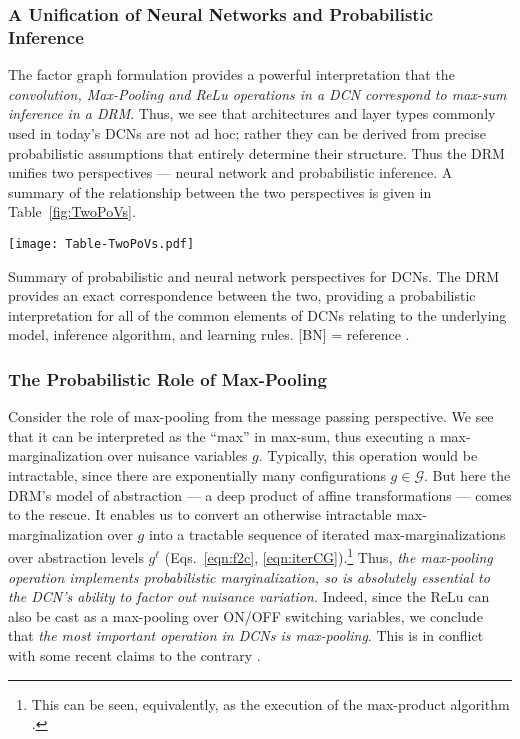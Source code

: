 \documentclass[12pt]{article}
\newcommand{\G}[0]{{ \mathcal{G} }}
\begin{document}
\subsubsection{A Unification of Neural Networks and Probabilistic Inference}

The factor graph formulation provides a powerful interpretation that the \emph{convolution, Max-Pooling and ReLu operations in a DCN correspond to max-sum inference in a DRM}. 
Thus, we see that architectures and layer types commonly used in today's DCNs are not ad hoc; rather they can be derived from precise probabilistic assumptions that entirely determine their structure. 
Thus the DRM unifies two perspectives --- neural network and probabilistic inference.
A summary of the relationship between the two perspectives is given in Table~\ref{fig:TwoPoVs}.

\begin{table}
   \centering
   \texttt{[image: Table-TwoPoVs.pdf]} 
   \caption{Summary of probabilistic and neural network perspectives for DCNs. The DRM provides an exact correspondence between the two, providing a probabilistic interpretation for all of the common elements of DCNs relating to the underlying model, inference algorithm, and learning rules. [BN] = reference \cite{ioffe2015batch}.}
   \label{fig:TwoPoVs}
\end{table}

\subsubsection{The Probabilistic Role of Max-Pooling} 

Consider the role of max-pooling from the message passing perspective.  We see that it can be interpreted as the ``max'' in max-sum, thus executing a max-marginalization over nuisance variables $g$. Typically, this operation would be intractable, since there are exponentially many configurations $g \in \G$. But here the DRM's model of abstraction --- a deep product of affine transformations --- comes to the rescue. It enables us to convert an otherwise intractable max-marginalization over $g$ into a tractable sequence of iterated max-marginalizations over abstraction levels $g^{\ell}$ (Eqs.~\ref{eqn:f2c}, \ref{eqn:iterCG}).\footnote{This can be seen, equivalently, as the execution of the max-product algorithm \cite{felzenszwalb2006efficient}.} 
Thus, \emph{the max-pooling operation implements probabilistic marginalization, so is absolutely essential to the DCN's ability to factor out nuisance variation.} 
Indeed, since the ReLu can also be cast as a max-pooling over ON/OFF switching variables, we conclude that \emph{the most important operation in DCNs is max-pooling}. 
This is in conflict with some recent claims to the contrary \cite{hintonVideo}.  
\end{document}
